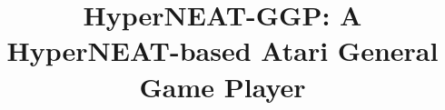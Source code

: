 \documentclass{acm_proc_article-sp}
\begin{document}
\title{HyperNEAT-GGP: A HyperNEAT-based Atari General Game Player}
%
%
%
%
%
\end{document}
